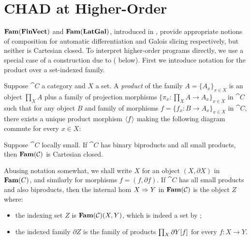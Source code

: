 \section{CHAD at Higher-Order}
\label{sec:higher-order}

$\mathbf{Fam}(\mathbf{FinVect})$ and $\mathbf{Fam}(\mathbf{LatGal})$, introduced in , provide appropriate notions of
composition for automatic differentiation and Galois slicing respectively, but neither is Cartesian closed. To
interpret higher-order programs directly, we use a special case of a construction due to \citet{nunes2023}
( below). First we introduce notation for the product over a set-indexed family.

\begin{definition}
Suppose $\cat{C}$ a category and $X$ a
set. A \emph{product} of the family $A = \{A_x\}_{x \in X}$ is an object $\prod_{X}A$ plus a family of
projection morphisms $\{\pi_x: \prod_{X} A \to A_x\}_{x \in X}$ in $\cat{C}$ such that for any object $B$ and
family of morphisms $f = \{f_x: B \to A_x\}_{x \in X}$ in $\cat{C}$, there exists a unique product morphism
$\langle f\rangle$ making the following diagram commute for every $x \in X$:

\begin{center}
\end{center}
\end{definition}

\begin{proposition}
\label{prop:higher-order:fam-CC}
Suppose $\cat{C}$ locally small. If $\cat{C}$ has binary biproducts and all small products, then
$\mathbf{Fam}(\mathcal{C})$ is Cartesian closed.
\end{proposition}

Abusing notation somewhat, we shall write $X$ for an object $(X, \partial X)$ in $\mathbf{Fam}(C)$, and similarly for
morphisms $f = (f, \partial f)$. If $\cat{C}$ has all small products and also biproducts, then the internal
hom $X \Rightarrow Y$ in $\mathbf{Fam}(\mathcal{C})$ is the object $Z$ where:
\begin{itemize}
\item the indexing set $Z$ is $\mathbf{Fam}(\mathcal{C})(X, Y)$, which is indeed a set by
;
\item the indexed family $\partial Z$ is the family of products $\prod_{X}\partial Y[f]$ for every
${f: X \to Y}$.
\end{itemize}


